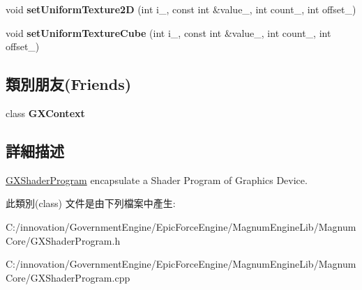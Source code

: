 \begin{DoxyCompactItemize}
\item 
void {\bfseries set\+Uniform\+Texture2D} (int i\+\_\+, const int \&value\+\_\+, int count\+\_, int offset\+\_)\hypertarget{class_i_dream_sky_1_1_g_x_shader_program_abb322aa0c357504e8b1d1144ea61d709}{}\label{class_i_dream_sky_1_1_g_x_shader_program_abb322aa0c357504e8b1d1144ea61d709}

\item 
void {\bfseries set\+Uniform\+Texture\+Cube} (int i\+\_\+, const int \&value\+\_\+, int count\+\_, int offset\+\_)\hypertarget{class_i_dream_sky_1_1_g_x_shader_program_aa0f7f3abf8dcdc147570ef983fabd63d}{}\label{class_i_dream_sky_1_1_g_x_shader_program_aa0f7f3abf8dcdc147570ef983fabd63d}

\end{DoxyCompactItemize}
\subsection*{類別朋友(Friends)}
\begin{DoxyCompactItemize}
\item 
class {\bfseries G\+X\+Context}\hypertarget{class_i_dream_sky_1_1_g_x_shader_program_a2c36d7f8865080802bbad88cd73d871c}{}\label{class_i_dream_sky_1_1_g_x_shader_program_a2c36d7f8865080802bbad88cd73d871c}

\end{DoxyCompactItemize}


\subsection{詳細描述}
\hyperlink{class_i_dream_sky_1_1_g_x_shader_program}{G\+X\+Shader\+Program} encapsulate a Shader Program of Graphics Device. 

此類別(class) 文件是由下列檔案中產生\+:\begin{DoxyCompactItemize}
\item 
C\+:/innovation/\+Government\+Engine/\+Epic\+Force\+Engine/\+Magnum\+Engine\+Lib/\+Magnum\+Core/G\+X\+Shader\+Program.\+h\item 
C\+:/innovation/\+Government\+Engine/\+Epic\+Force\+Engine/\+Magnum\+Engine\+Lib/\+Magnum\+Core/G\+X\+Shader\+Program.\+cpp\end{DoxyCompactItemize}
